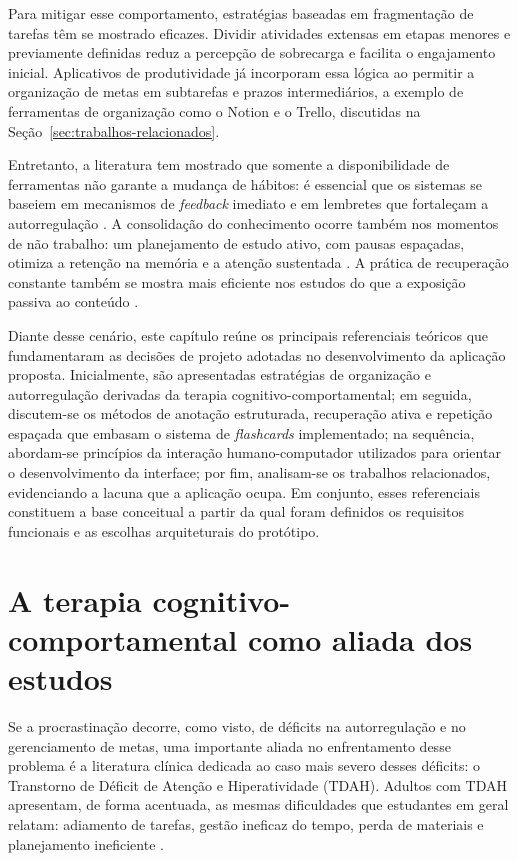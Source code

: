\documentclass[12pt, %
openright, 
oneside,
a4paper,
english,   %
brazil]{facom-ufu-abntex2}
\begin{document}
Para mitigar esse comportamento, estratégias baseadas em fragmentação de
tarefas têm se mostrado eficazes. Dividir atividades extensas em etapas
menores e previamente definidas reduz a percepção de sobrecarga e facilita o
engajamento inicial. Aplicativos de produtividade já incorporam essa lógica ao
permitir a organização de metas em subtarefas e prazos intermediários, a
exemplo de ferramentas de organização como o Notion e o Trello, discutidas na
Seção~\ref{sec:trabalhos-relacionados}.

Entretanto, a literatura tem mostrado que somente a disponibilidade de
ferramentas não garante a mudança de hábitos: é essencial que os sistemas se
baseiem em mecanismos de \textit{feedback} imediato e em lembretes que
fortaleçam a autorregulação \cite{EducationAppDevelopmentNeedsTpBeInformedByNeuroscience}.
A consolidação do conhecimento ocorre também nos momentos de não trabalho: um
planejamento de estudo ativo, com pausas espaçadas, otimiza a retenção na
memória e a atenção sustentada
\cite{OfflineMemoryConsolidation,BreaksAndSustainedAttention}. A prática de
recuperação constante também se mostra mais eficiente nos estudos do que a
exposição passiva ao conteúdo
\cite{EducationAppDevelopmentNeedsTpBeInformedByNeuroscience}.

Diante desse cenário, este capítulo reúne os principais referenciais teóricos
que fundamentaram as decisões de projeto adotadas no desenvolvimento da
aplicação proposta. Inicialmente, são apresentadas estratégias de organização
e autorregulação derivadas da terapia cognitivo-comportamental; em seguida,
discutem-se os métodos de anotação estruturada, recuperação ativa e repetição
espaçada que embasam o sistema de \textit{flashcards} implementado; na
sequência, abordam-se princípios da interação humano-computador utilizados
para orientar o desenvolvimento da interface; por fim, analisam-se os
trabalhos relacionados, evidenciando a lacuna que a aplicação ocupa. Em
conjunto, esses referenciais constituem a base conceitual a partir da qual
foram definidos os requisitos funcionais e as escolhas arquiteturais do
protótipo.

\section{A terapia cognitivo-comportamental como aliada dos estudos}
\label{sec:estrategias-comportamentais}

Se a procrastinação decorre, como visto, de déficits na autorregulação e no
gerenciamento de metas, uma importante aliada no enfrentamento desse problema
é a literatura clínica dedicada ao caso mais severo desses déficits: o
Transtorno de Déficit de Atenção e Hiperatividade (TDAH). Adultos com TDAH
apresentam, de forma acentuada, as mesmas dificuldades que estudantes em geral
relatam: adiamento de tarefas, gestão ineficaz do tempo, perda de materiais e
planejamento ineficiente \cite{SafrenMasteringADHD}.
\end{document}
